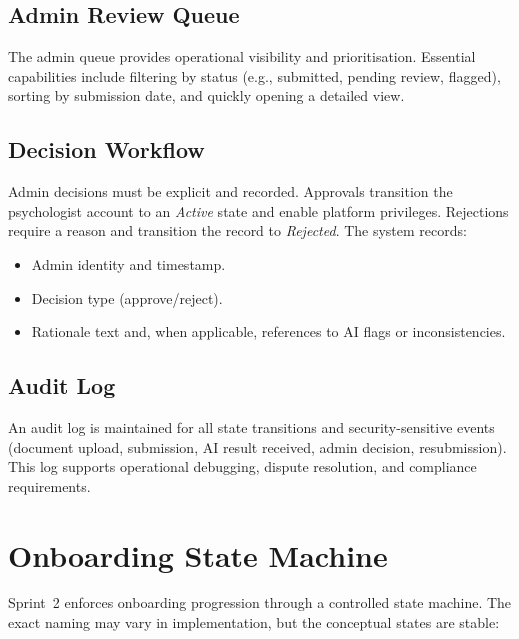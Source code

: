\subsection{Admin Review Queue}
The admin queue provides operational visibility and prioritisation. Essential
capabilities include filtering by status (e.g., submitted, pending review,
flagged), sorting by submission date, and quickly opening a detailed view.

\subsection{Decision Workflow}
Admin decisions must be explicit and recorded. Approvals transition the
psychologist account to an \emph{Active} state and enable platform privileges.
Rejections require a reason and transition the record to \emph{Rejected}. The
system records:

\begin{itemize}
    \item Admin identity and timestamp.
    \item Decision type (approve/reject).
    \item Rationale text and, when applicable, references to AI flags or
    inconsistencies.
\end{itemize}

\subsection{Audit Log}
An audit log is maintained for all state transitions and security-sensitive
events (document upload, submission, AI result received, admin decision,
resubmission). This log supports operational debugging, dispute resolution, and
compliance requirements.

\section{Onboarding State Machine}
\label{sec:sprint2-state-machine}

Sprint~2 enforces onboarding progression through a controlled state machine.
The exact naming may vary in implementation, but the conceptual states are
stable:

